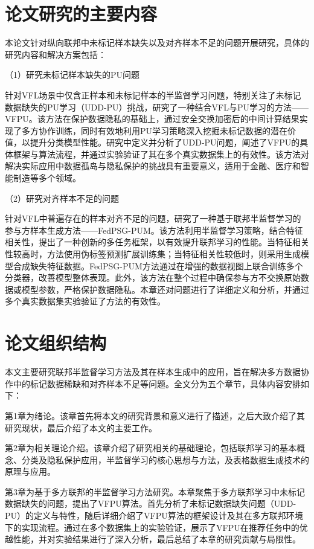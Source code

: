 \section{论文研究的主要内容}
本论文针对纵向联邦中未标记样本缺失以及对齐样本不足的问题开展研究，具体的研究内容和解决方案包括：

（1）研究未标记样本缺失的PU问题

针对VFL场景中仅含正样本和未标记样本的半监督学习问题，特别关注了未标记数据缺失的PU学习（UDD-PU）挑战，研究了一种结合VFL与PU学习的方法——VFPU。该方法在保护数据隐私的基础上，通过安全交换加密后的中间计算结果实现了多方协作训练，同时有效地利用PU学习策略深入挖掘未标记数据的潜在价值，以提升分类模型性能。研究中定义并分析了UDD-PU问题，阐述了VFPU的具体框架与算法流程，并通过实验验证了其在多个真实数据集上的有效性。该方法对解决实际应用中数据孤岛与隐私保护的挑战具有重要意义，适用于金融、医疗和智能制造等多个领域。

（2）研究对齐样本不足的问题

针对VFL中普遍存在的样本对齐不足的问题，研究了一种基于联邦半监督学习的参与方样本生成方法——FedPSG-PUM。该方法利用半监督学习策略，结合特征相关性，提出了一种创新的多任务框架，以有效提升联邦学习的性能。当特征相关性较高时，方法使用伪标签预测扩展训练集；当特征相关性较低时，则采用生成模型合成缺失特征数据。FedPSG-PUM方法通过在增强的数据视图上联合训练多个分类器，改善模型整体表现。此外，该方法在整个过程中确保参与方不交换原始数据或模型参数，严格保护数据隐私。本章还对问题进行了详细定义和分析，并通过多个真实数据集实验验证了方法的有效性。

\section{论文组织结构}
本文主要研究联邦半监督学习方法及其在样本生成中的应用，旨在解决多方数据协作中的标记数据稀缺和对齐样本不足等问题。全文分为五个章节，具体内容安排如下：


第1章为绪论。该章首先将本文的研究背景和意义进行了描述，之后大致介绍了其研究现状，最后介绍了本文的主要工作。

第2章为相关理论介绍。该章介绍了研究相关的基础理论，包括联邦学习的基本概念、分类及隐私保护应用，半监督学习的核心思想与方法，及表格数据生成技术的原理与应用。

第3章为基于多方联邦的半监督学习方法研究。本章聚焦于多方联邦学习中未标记数据缺失的问题，提出了VFPU算法。首先分析了未标记数据缺失问题（UDD-PU）的定义与特性，随后详细介绍了VFPU算法的框架设计及其在多方联邦环境下的实现流程。通过在多个数据集上的实验验证，展示了VFPU在推荐任务中的优越性能，并对实验结果进行了深入分析，最后总结了本章的研究贡献与局限性。

